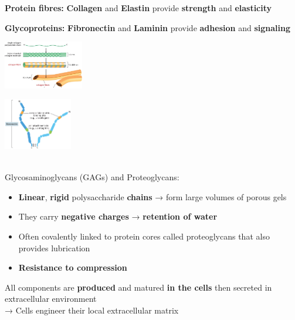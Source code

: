 \begin{minipage}{0.45\linewidth}
    \textbf{Protein fibres:} \textbf{Collagen} and \textbf{Elastin}      provide \textbf{strength} and \textbf{elasticity}
\end{minipage}
\begin{minipage}{0.45\linewidth}
    \textbf{Glycoproteins:} \textbf{Fibronectin} and \textbf{Laminin}      provide \textbf{adhesion} and \textbf{signaling}
\end{minipage}
\begin{minipage}{0.45\linewidth}
    \includegraphics[width=35mm]{src/Images/collagen.png}
\end{minipage}
\begin{minipage}{0.45\linewidth}
    \includegraphics[width=30mm]{src/Images/glycoprotein.png}
\end{minipage}\\

Glycosaminoglycans (GAGs) and Proteoglycans:\\

\begin{itemize}
    \item \textbf{Linear}, \textbf{rigid} polysaccharide \textbf{chains} → form large volumes of porous gels
    \item They carry \textbf{negative charges} → \textbf{retention of water}
    \item Often covalently linked to protein cores called proteoglycans that also provides lubrication
    \item \textbf{Resistance to compression}
\end{itemize}

All components are \textbf{produced} and matured \textbf{in the cells} then secreted in extracellular environment\\
→ Cells engineer their local extracellular matrix
